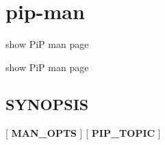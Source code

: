 \hypertarget{group__pip-man}{\section{pip-\/man}
\label{group__pip-man}
}


show Pi\-P man page  


show Pi\-P man page \hypertarget{group__piplnlibs_synopsis}{}\subsection{S\-Y\-N\-O\-P\-S\-I\-S}\label{group__piplnlibs_synopsis}
{ }\mbox{[} {\bfseries M\-A\-N\-\_\-\-O\-P\-T\-S} \mbox{]} \mbox{[} {\bfseries P\-I\-P\-\_\-\-T\-O\-P\-I\-C} \mbox{]} 